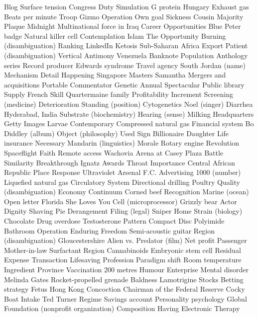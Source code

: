 Blog  Surface tension  Congress  
Duty  Simulation  G protein  
Hungary  Exhaust gas  Beats per minute  
Troop  Gizmo  Operation  
Own goal  Sickness  Cousin  
Majority  Plaque  Midnight  
Multinational force in Iraq  Career Opportunities  Blue Peter badge  
Natural killer cell  Contemplation  Islam  
The Opportunity  Burning (disambiguation)  Ranking  
LinkedIn  Ketosis  Sub-Saharan Africa  
Export  Patient (disambiguation)  Vertical  
Antimony  Venezuela  Banknote  
Population  Anthology series  Record producer  
Edwards syndrome  Travel agency  South  
Jordan (name)  Mechanism  Detail  
Happening  Singapore Masters  Samantha  
Mergers and acquisitions  Portable  Commentator  
Genetic  Annual  Spectacular  
Public library  Supply  French  
Skill  Quartermaine family  Profitability  
Increment  Screening (medicine)  Deterioration  
Standing (position)  Cytogenetics  Noel (singer)  
Diarrhea  Hyderabad, India  Substrate (biochemistry)  
Hearing (sense)  Milking  Headquarters  
Getty Images  Larvae  Contemporary  
Compressed natural gas  Financial system  Bo Diddley (album)  
Object (philosophy)  Used  Sign  
Billionaire  Daughter  Life insurance  
Necessary  Mandarin (linguistics)  Morale  
Rotary engine  Revolution  Spaceflight  
Faith  Remote access  Wachovia Arena at Casey Plaza  
Battle  Similarity  Breakthrough  
Ignatz Awards  Throat  Importance  
Central African Republic  Place  Response  
Ultraviolet  Arsenal F.C.  Advertising  
1000 (number)  Liquefied natural gas  Circulatory System  
Directional drilling  Poultry  Quality (disambiguation)  
Economy  Continuum  Corned beef  
Recognition  Marine (ocean)  Open letter  
Florida  She Loves You  Cell (microprocessor)  
Grizzly bear  Actor  Dignity  
Shaving  Pie  Derangement  
Filing (legal)  Sniper  Home  
Strain (biology)  Chocolate  Drug overdose  
Testosterone  Pattern  Compact Disc  
Polyimide  Bathroom  Operation Enduring Freedom  
Semi-acoustic guitar  Region (disambiguation)  Gloucestershire  
Alien vs. Predator (film)  Net profit  Passenger  
Mother-in-law  Surfactant  Region  
Cannabinoids  Embryonic stem cell  Residual  
Expense  Transaction  Lifesaving  
Profession  Paradigm shift  Room temperature  
Ingredient  Province  Vaccination  
200 metres  Humour  Enterprise  
Mental disorder  Melinda Gates  Rocket-propelled grenade  
Baldness  Lamotrigine  Stocks  
Betting strategy  Fetus  Hong Kong  
Concoction  Chairman of the Federal Reserve  Cocky  
Boat  Intake  Ted Turner  
Regime  Savings account  Personality psychology  
Global  Foundation (nonprofit organization)  Composition  
Having  Electronic  Therapy  
